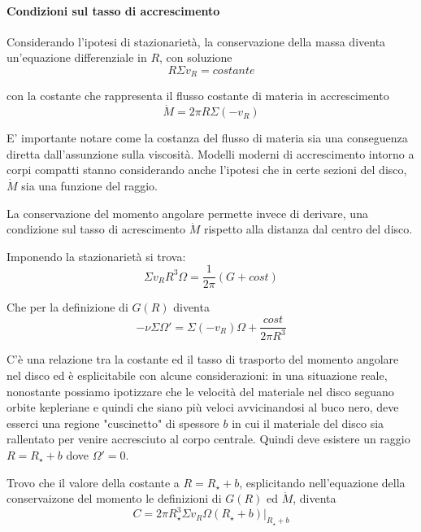 \documentclass[a4paperbi]{article}
\begin{document}
	\paragraph{Condizioni sul tasso di accrescimento}
	Considerando l'ipotesi di stazionarietà, la conservazione della massa diventa un'equazione differenziale in $R$, con soluzione
	\begin{equation}
		R\Sigma v_R=costante
	\end{equation}
	
	con la costante che rappresenta il flusso costante di materia in accrescimento
	\begin{equation}
		\dot{M}=2\pi R\Sigma(-v_R)
	\end{equation}
	
	E' importante notare come la costanza del flusso di materia sia una conseguenza diretta dall'assunzione sulla viscosità. Modelli moderni di accrescimento intorno a corpi compatti stanno considerando anche l'ipotesi che in certe sezioni del disco, $\dot{M}$ sia una funzione del raggio.
	
	La conservazione del momento angolare permette invece di derivare, una condizione sul tasso di acrescimento $\dot{M}$ rispetto alla distanza dal centro del disco.
	
	Imponendo la stazionarietà si trova:
	\begin{equation}
		\Sigma v_RR^3\Omega=\frac{1}{2\pi}(G+cost)
	\end{equation}
	
	Che per la definizione di $G(R)$ diventa
	\begin{equation}
		-\nu\Sigma\Omega'=\Sigma(-v_R)\Omega+\frac{cost}{2\pi R^3}
	\end{equation}
	
	C'è una relazione tra la costante ed il tasso di trasporto del momento angolare nel disco ed è esplicitabile con alcune considerazioni: in una situazione reale, nonostante possiamo ipotizzare che le velocità del materiale nel disco seguano orbite kepleriane e quindi che siano più veloci avvicinandosi al buco nero, deve esserci una regione "cuscinetto" di spessore $b$ in cui il materiale del disco sia rallentato per venire accresciuto al corpo centrale. Quindi deve esistere un raggio $R=R_{\star}+b$ dove $\Omega'=0$.

	Trovo che il valore della costante a $R=R_{\star}+b$, esplicitando nell'equazione della conservaizone del momento le definizioni di $G(R)$ ed $\dot{M}$, diventa
	\begin{equation*}
		C=2\pi R_{\star}^3\Sigma v_R\Omega(R_{\star}+b)\vert_{R_{\star}+b}
	\end{equation*}
	
\end{document}
